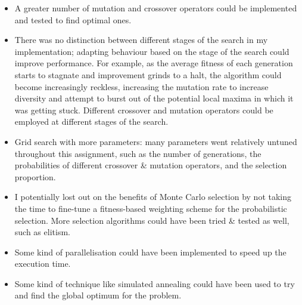 \documentclass[a4paper]{article}
\begin{document}
\begin{itemize}
    \item   A greater number of mutation and crossover operators could be implemented and tested to find optimal ones.

    \item   There was no distinction between different stages of the search in my implementation;
            adapting behaviour based on the stage of the search could improve performance.
            For example, as the average fitness of each generation starts to stagnate and improvement grinds to a halt, the algorithm could become increasingly reckless, increasing the mutation rate to increase diversity and attempt to burst out of the potential local maxima in which it was getting stuck.
            Different crossover and mutation operators could be employed at different stages of the search.

    \item   Grid search with more parameters: many parameters went relatively untuned throughout this assignment, such as the number of generations, the probabilities of different crossover \& mutation operators, and the selection proportion.

    \item   I potentially lost out on the benefits of Monte Carlo selection by not taking the time to fine-tune a fitness-based weighting scheme for the probabilistic selection.
            More selection algorithms could have been tried \& tested as well, such as elitism.

    \item   Some kind of parallelisation could have been implemented to speed up the execution time.

    \item   Some kind of technique like simulated annealing could have been used to try and find the global optimum for the problem.

\end{itemize}

\nocite{*}
\printbibliography
\end{document}
